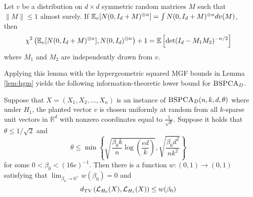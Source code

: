 \begin{lemma} \label{lem:chispca}
Let $v$ be a distribution on $d \times d$ symmetric random matrices $M$ such that $\| M \| \le 1$ almost surely. If $\mathbb{E}_v[N(0, I_d + M)^{\otimes n}] = \int N(0, I_d + M)^{\otimes n} dv(M)$, then
$$\chi^2\left( \mathbb{E}_v[N(0, I_d + M)^{\otimes n}], N(0, I_d)^{\otimes n} \right) + 1 = \mathbb{E} \left[ \det(I_d - M_1 M_2)^{-n/2} \right]$$
where $M_1$ and $M_2$ are independently drawn from $v$.
\end{lemma}

Applying this lemma with the hypergeometric squared MGF bounds in Lemma \ref{lem:hgm} yields the following information-theoretic lower bound for $\textsc{BSPCA}_D$.

\begin{theorem}
Suppose that $X = (X_1, X_2, \dots, X_n)$ is an instance of $\textsc{BSPCA}_D(n, k, d, \theta)$ where under $H_1$, the planted vector $v$ is chosen uniformly at random from all $k$-sparse unit vectors in $\mathbb{R}^d$ with nonzero coordinates equal to $\frac{1}{\sqrt{k}}$. Suppose it holds that $\theta \le 1/\sqrt{2}$ and
$$\theta \le \min\left\{ \sqrt{\frac{\beta_0 k}{n} \log \left( \frac{ed}{k} \right)}, \sqrt{\frac{\beta_0 d^2}{nk^2}}\right\}$$
for some $0 < \beta_0 < (16e)^{-1}$. Then there is a function $w : (0, 1) \to (0, 1)$ satisfying that $\lim_{\beta_0 \to 0^+} w(\beta_0) = 0$ and
$$d_{\text{TV}}\left( \mathcal{L}_{H_0}(X), \mathcal{L}_{H_1}(X) \right) \le w(\beta_0)$$
\end{theorem}

